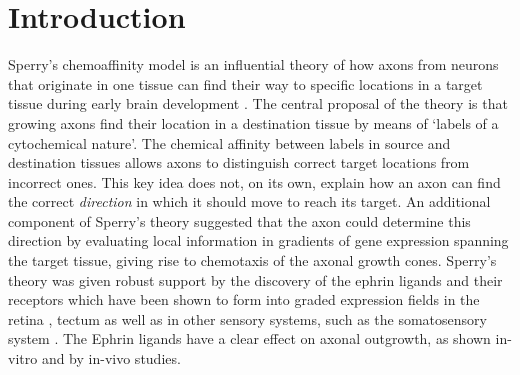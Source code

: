 \documentclass[11pt, a4paper]{article}
\begin{document}

\section{Introduction}

Sperry's chemoaffinity model is an influential theory of how axons from neurons that originate in one tissue can find their way to specific locations in a target tissue during early brain development \citep{sperry_chemoaffinity_1963}.
%
The central proposal of the theory is that growing axons find their location in a destination tissue by means of `labels of a cytochemical nature'.
The chemical affinity between labels in source and destination tissues allows axons to distinguish correct target locations from incorrect ones.
%
This key idea does not, on its own, explain how an axon can find the correct \emph{direction} in which it should move to reach its target.
An additional component of Sperry's theory \citep{gaze?} suggested that the axon could determine this direction by evaluating local information in gradients of gene expression spanning the target tissue, giving rise to chemotaxis of the axonal growth cones.
%
Sperry's theory was given robust support by the discovery of the ephrin ligands and their receptors \citep{cheng_complementary_1995,drescher_vitro_1995} which have been shown to form into graded expression fields in the retina \citep{braisted_graded_1997}, tectum \citep{braisted_graded_1997,feldheim_genetic_2000} as well as in other sensory systems, such as the somatosensory system \citep{vanderhaeghen_mapping_2000}.
%
The Ephrin ligands have a clear effect on axonal outgrowth, as shown in-vitro \citep{cheng_complementary_1995,drescher_vitro_1995,hansen_retinal_2004} and by in-vivo \citep{frisen_ephrin-a5_1998,rodger_transient_2000,mann_topographic_2002,hindges_ephb_2002} studies.
\end{document}

